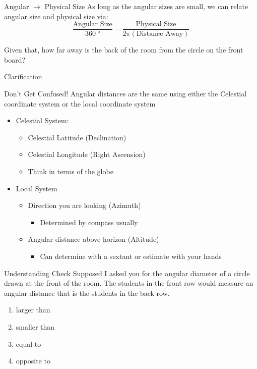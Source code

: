 \documentclass[pdf, aspectratio=169]{beamer}
\begin{document}
\begin{frame}{Angular $\rightarrow$ Physical Size}
	As long as the angular sizes are small, we can relate angular size and physical size via:
	\[\frac{\text{Angular Size}}{\SI{360}{\degree}} = \frac{\text{Physical Size}}{2\pi(\text{Distance Away})}\]
	\begin{example}
		Given that, how far away is the back of the room from the circle on the front board?
	\end{example}
\end{frame}

\begin{frame}{Clarification}
  \begin{alertblock}{Don't Get Confused!}
	Angular distances are the same using either the Celestial coordinate system or the local coordinate system
  \end{alertblock}
  \begin{itemize}
	\item Celestial System:
	  \begin{itemize}
		\item Celestial Latitude (Declination)
		\item Celestial Longitude (Right Ascension)
		\item Think in terms of the globe
	  \end{itemize}
	\item Local System
	  \begin{itemize}
		\item Direction you are looking (Azimuth)
		  \begin{itemize}
			\item Determined by compass usually
		  \end{itemize}
		\item Angular distance above horizon (Altitude)
		  \begin{itemize}
			\item Can determine with a sextant or estimate with your hands
		  \end{itemize}
	  \end{itemize}
  \end{itemize}
\end{frame}

\begin{frame}{Understanding Check}
  Supposed I asked you for the angular diameter of a circle drawn at the front of the room. The students in the front row would measure an angular distance that is \underline{\hspace{2cm}} the students in the back row.
  \begin{enumerate}
	\item \alert<2>{larger than}
	\item smaller than
	\item equal to
	\item opposite to
  \end{enumerate}
\end{frame}
\end{document}
